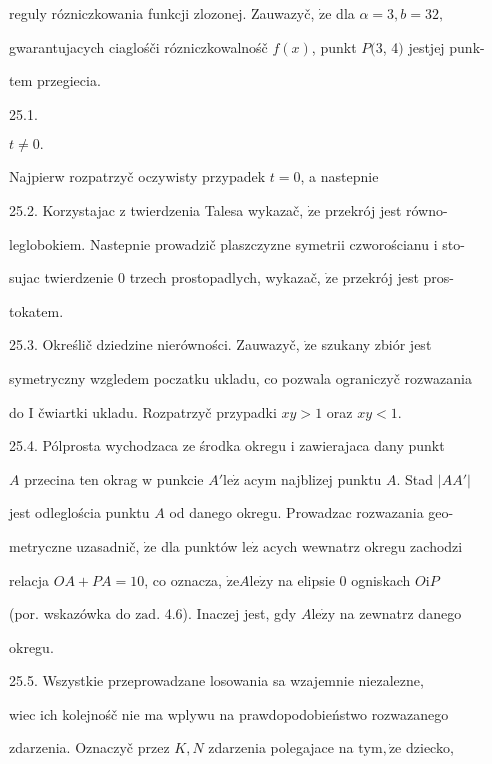 \documentclass[a4paper,12pt]{article}
\begin{document}
reguly rózniczkowania funkcji zlozonej. Zauwazyč, $\dot{\mathrm{z}}\mathrm{e}$ dla $\alpha= 3, b= 32,$

gwarantujacych ciaglośči rózniczkowalnośč $f(x)$, punkt $P(3$, 4$)$ jestjej punk-

tem przegiecia.

25.1.

$t\neq 0.$

Najpierw rozpatrzyč oczywisty przypadek $t = 0$, a nastepnie

25.2. Korzystajac $\mathrm{z}$ twierdzenia Talesa wykazač, $\dot{\mathrm{z}}\mathrm{e}$ przekrój jest równo-

leglobokiem. Nastepnie prowadzič plaszczyzne symetrii czworościanu $\mathrm{i}$ sto-

sujac twierdzenie $0$ trzech prostopadlych, wykazač, $\dot{\mathrm{z}}\mathrm{e}$ przekrój jest pros-

tokatem.

25.3. Określič dziedzine nierówności. Zauwazyč, $\dot{\mathrm{z}}\mathrm{e}$ szukany zbiór jest

symetryczny wzgledem poczatku ukladu, co pozwala ograniczyč rozwazania

do I čwiartki ukladu. Rozpatrzyč przypadki $xy>1$ oraz $xy<1.$

25.4. Pólprosta wychodzaca ze środka okregu $\mathrm{i}$ zawierajaca dany punkt

$A$ przecina ten okrag $\mathrm{w}$ punkcie $A'\mathrm{l}\mathrm{e}\dot{\mathrm{z}}$ acym najblizej punktu $A$. Stad $|AA'|$

jest odleglościa punktu $A$ od danego okregu. Prowadzac rozwazania geo-

metryczne uzasadnič, $\dot{\mathrm{z}}\mathrm{e}$ dla punktów $\mathrm{l}\mathrm{e}\dot{\mathrm{z}}$ acych wewnatrz okregu zachodzi

relacja $OA+PA=10$, co oznacza, $\dot{\mathrm{z}}\mathrm{e}A\mathrm{l}\mathrm{e}\dot{\mathrm{z}}\mathrm{y}$ na elipsie $0$ ogniskach $O\mathrm{i}P$

(por. wskazówka do $\mathrm{z}\mathrm{a}\mathrm{d}$. 4.6). Inaczej jest, gdy $A\mathrm{l}\mathrm{e}\dot{\mathrm{z}}\mathrm{y}$ na zewnatrz danego

okregu.

25.5. Wszystkie przeprowadzane losowania sa wzajemnie niezalezne,

wiec ich kolejnośč nie ma wplywu na prawdopodobieństwo rozwazanego

zdarzenia. Oznaczyč przez $K, N$ zdarzenia polegajace na $\mathrm{t}\mathrm{y}\mathrm{m}, \dot{\mathrm{z}}\mathrm{e}$ dziecko,
\end{document}
